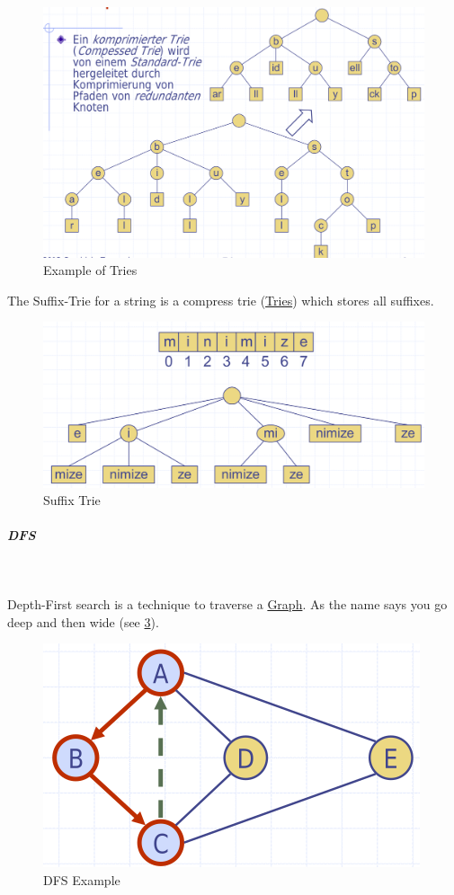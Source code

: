 \documentclass[11pt,twoside,twocolumn,landscape]{article}
\begin{document}
\begin{figure}[htbp]
\centering
\includegraphics[width=.9\linewidth]{img/tries.png}
\caption{\label{fig:org7fcdff5}Example of Tries}
\end{figure}


The Suffix-Trie for a string is a compress trie (\href{../../../roam/20220201152933-tries.org}{Tries}) which stores all suffixes.

\begin{figure}[htbp]
\centering
\includegraphics[width=.9\linewidth]{img/suffix_trie.png}
\caption{\label{fig:org3de1e5f}Suffix Trie}
\end{figure}

\subparagraph{DFS} \
\label{sec:org3f0cf13}

Depth-First search is a technique to traverse a \href{../../../roam/20220201163000-graph.org}{Graph}.
As the name says you go deep and then wide (see \ref{fig:org57a9bb3}).


\begin{figure}[htbp]
\centering
\includegraphics[width=.9\linewidth]{img/dfs.png}
\caption{\label{fig:org57a9bb3}DFS Example}
\end{figure}
\end{document}
